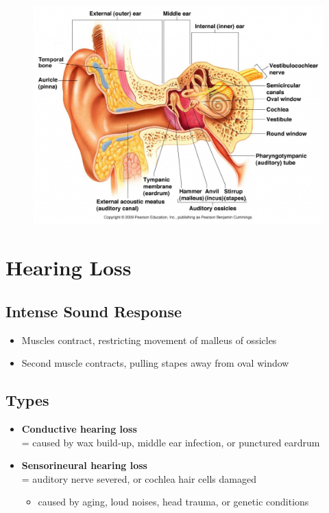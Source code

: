 \documentclass[a4paper,12pt]{article}
\begin{document}
\begin{figure}[H]
    \centering
    \includegraphics[width=\textwidth]{ear2}
\end{figure}

\section{Hearing Loss}
\subsection{Intense Sound Response}
\begin{itemize}
    \item{Muscles contract, restricting movement of malleus of ossicles}
    \item{Second muscle contracts, pulling stapes away from oval window}
\end{itemize}

\subsection{Types}
\begin{itemize}
    \item{\textbf{Conductive hearing loss}\\= caused by wax build-up, middle ear infection, or punctured eardrum}
    \item{
            \textbf{Sensorineural hearing loss}\\= auditory nerve severed, or cochlea hair cells damaged
            \begin{itemize}
                \item{caused by aging, loud noises, head trauma, or genetic conditions}
            \end{itemize}
        }
\end{itemize}
\end{document}
